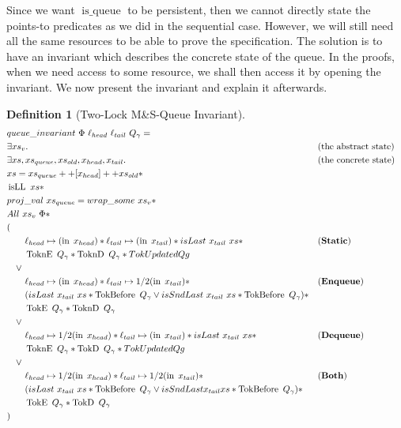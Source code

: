 \documentclass[twoside,11pt,openright]{report}
\newtheorem{definition}{Definition}[section]
\newcommand{\isqueue}{\operatorname{is\_queue}}
\newcommand{\isLL}{\operatorname{isLL}}
\newcommand{\nIn}[1]{\operatorname{in} \; #1}
\newcommand{\StaticState}{\textbf{Static}}
\newcommand{\EnqueueState}{\textbf{Enqueue}}
\newcommand{\DequeueState}{\textbf{Dequeue}}
\newcommand{\BothState}{\textbf{Both}}
\newcommand{\Qgnames}{Q_\gname}
\newcommand{\TokE}[1]{\operatorname{TokE}\ #1}
\newcommand{\TokEQg}{\TokE{\Qgnames}}
\newcommand{\ToknE}[1]{\operatorname{ToknE}\ #1}
\newcommand{\ToknEQg}{\ToknE{\Qgnames}}
\newcommand{\TokD}[1]{\operatorname{TokD}\ #1}
\newcommand{\TokDQg}{\TokD{\Qgnames}}
\newcommand{\ToknD}[1]{\operatorname{ToknD}\ #1}
\newcommand{\ToknDQg}{\ToknD{\Qgnames}}
\newcommand{\TokBefore}[1]{\operatorname{TokBefore}\ #1}
\newcommand{\TokBeforeQg}{\TokBefore{\Qgnames}}
\newcommand{\TokAfterQg}{\TokBefore{\Qgnames}}
\begin{document}
Since we want $\isqueue$ to be persistent, then we cannot directly state the points-to predicates as we did in the sequential case. However, we will still need all the same resources to be able to prove the specification. The solution is to have an invariant which describes the concrete state of the queue. In the proofs, when we need access to some resource, we shall then access it by opening the invariant. We now present the invariant and explain it afterwards.
\begin{definition}[Two-Lock M\&S-Queue Invariant]\label{MSQTL:spec:invariant}
  \begin{align*}
    &queue\_invariant \ \Phi \ \loc_{head} \ \loc_{tail} \ Q_\gname =\\
    &\exists xs_v. &&\text{(the abstract state)}\\
    &\exists xs, xs_{queue}, xs_{old}, x_{head}, x_{tail} . &&\text{(the concrete state)}\\
    &xs = xs_{queue} ++ [x_{head}] ++ xs_{old} \ast\\
    &\isLL \ xs \ast\\
    &proj\_val \ xs_{queue} = wrap\_some \ xs_v \ast\\
    &All \ xs_v \ \Phi \ast\\
    &(\\
    &\quad\quad\loc_{head} \mapsto (\nIn{x_{head}}) \ast \loc_{tail} \mapsto (\nIn{x_{tail}}) \ast isLast \ x_{tail} \ xs \ast &&\text{(\StaticState)}\\
    &\quad\quad \ToknEQg \ast \ToknDQg \ast TokUpdatedQg\\
    &\quad\lor\\
    &\quad\quad\loc_{head} \mapsto (\nIn{x_{head}}) \ast \loc_{tail} \mapsto{1/2} (\nIn{x_{tail}}) \ast &&\text{(\EnqueueState)}\\
    &\quad\quad (isLast \ x_{tail} \ xs \ast \TokBeforeQg \lor isSndLast \ x_{tail} \ xs \ast \TokAfterQg) \ast\\
    &\quad\quad \TokEQg \ast \ToknDQg\\
    &\quad\lor\\
    &\quad\quad\loc_{head} \mapsto{1/2} (\nIn{x_{head}}) \ast \loc_{tail} \mapsto (\nIn{x_{tail}}) \ast isLast \ x_{tail} \ xs \ast &&\text{(\DequeueState)}\\
    &\quad\quad \ToknEQg \ast \TokDQg \ast TokUpdatedQg\\
    &\quad\lor\\
    &\quad\quad\loc_{head} \mapsto{1/2} (\nIn{x_{head}}) \ast \loc_{tail} \mapsto{1/2} (\nIn{x_{tail}}) \ast &&\text{(\BothState)}\\
    &\quad\quad (isLast \ x_{tail} \ xs \ast \TokBeforeQg \lor isSndLast x_{tail} xs \ast \TokAfterQg) \ast\\
    &\quad\quad \TokEQg \ast \TokDQg\\
    &)
  \end{align*}
\end{definition}
\end{document}
